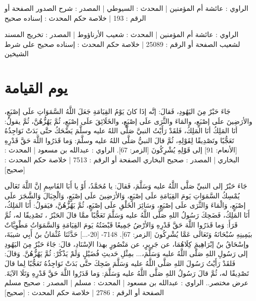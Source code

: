 الراوي : عائشة أم المؤمنين | المحدث : السيوطي | المصدر : شرح الصدور
الصفحة أو الرقم : 193 | خلاصة حكم المحدث : إسناده صحيح 

الراوي : عائشة أم المؤمنين | المحدث : شعيب الأرناؤوط | المصدر : تخريج المسند لشعيب
الصفحة أو الرقم : 25089 | خلاصة حكم المحدث : إسناده صحيح على شرط الشيخين 

\section{يوم القيامة}


جَاءَ حَبْرٌ مِنَ اليَهُودِ، فَقالَ: إنَّه إذَا كانَ يَوْمُ القِيَامَةِ جَعَلَ اللَّهُ السَّمَوَاتِ علَى إصْبَعٍ، والأرَضِينَ علَى إصْبَعٍ، والمَاءَ والثَّرَى علَى إصْبَعٍ، والخَلَائِقَ علَى إصْبَعٍ، ثُمَّ يَهُزُّهُنَّ، ثُمَّ يقولُ: أنَا المَلِكُ أنَا المَلِكُ، فَلقَدْ رَأَيْتُ النبيَّ صَلَّى اللهُ عليه وسلَّمَ يَضْحَكُ حتَّى بَدَتْ نَوَاجِذُهُ تَعَجُّبًا وتَصْدِيقًا لِقَوْلِهِ، ثُمَّ قالَ النبيُّ صَلَّى اللهُ عليه وسلَّمَ: {وَما قَدَرُوا اللَّهَ حَقَّ قَدْرِهِ} [الأنعام: 91] إلى قَوْلِهِ {يُشْرِكُونَ} [الزمر: 67].
الراوي : عبدالله بن مسعود | المحدث : البخاري | المصدر : صحيح البخاري
الصفحة أو الرقم : 7513 | خلاصة حكم المحدث : [صحيح]

جَاءَ حَبْرٌ إلى النبيِّ صَلَّى اللَّهُ عليه وَسَلَّمَ، فَقالَ: يا مُحَمَّدُ، أَوْ يا أَبَا القَاسِمِ إنَّ اللَّهَ تَعَالَى يُمْسِكُ السَّمَوَاتِ يَومَ القِيَامَةِ علَى إصْبَعٍ، وَالأرَضِينَ علَى إصْبَعٍ، وَالْجِبَالَ وَالشَّجَرَ علَى إصْبَعٍ، وَالْمَاءَ وَالثَّرَى علَى إصْبَعٍ، وَسَائِرَ الخَلْقِ علَى إصْبَعٍ، ثُمَّ يَهُزُّهُنَّ، فيَقولُ: أَنَا المَلِكُ، أَنَا المَلِكُ، فَضَحِكَ رَسُولُ اللهِ صَلَّى اللَّهُ عليه وَسَلَّمَ تَعَجُّبًا ممَّا قالَ الحَبْرُ ، تَصْدِيقًا له، ثُمَّ قَرَأَ: {وَما قَدَرُوا اللَّهَ حَقَّ قَدْرِهِ وَالأرْضُ جَمِيعًا قَبْضَتُهُ يَومَ القِيَامَةِ وَالسَّمَوَاتُ مَطْوِيَّاتٌ بيَمِينِهِ سُبْحَانَهُ وَتَعَالَى عَمَّا يُشْرِكُونَ} [الزمر: 67]. 7148- [20-...] حَدَّثَنَا عُثْمَانُ بنُ أَبِي شيبَةَ، وإسْحَاقُ بنُ إبْرَاهِيمَ كِلَاهُمَا، عن جَرِيرٍ، عن مَنْصُورٍ بهذا الإسْنَادِ، قالَ: جَاءَ حَبْرٌ مِنَ اليَهُودِ إلى رَسُولِ اللهِ صَلَّى اللَّهُ عليه وَسَلَّمَ،... بمِثْلِ حَديثِ فُضَيْلٍ وَلَمْ يَذْكُرْ: ثُمَّ يَهُزُّهُنَّ. وَقالَ: فَلقَدْ رَأَيْتُ رَسُولَ اللهِ صَلَّى اللَّهُ عليه وَسَلَّمَ ضَحِكَ حتَّى بَدَتْ نَوَاجِذُهُ تَعَجُّبًا لِما قالَ تَصْدِيقًا له، ثُمَّ قالَ رَسُولُ اللهِ صَلَّى اللَّهُ عليه وَسَلَّمَ: {وَما قَدَرُوا اللَّهَ حَقَّ قَدْرِهِ} وَتَلَا الآيَةَ.
عرض مختصر..
الراوي : عبدالله بن مسعود | المحدث : مسلم | المصدر : صحيح مسلم
الصفحة أو الرقم : 2786 | خلاصة حكم المحدث : [صحيح]


